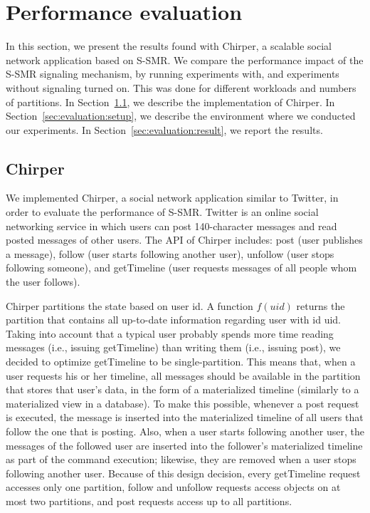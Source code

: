 \documentclass[11pt]{article}
\newcommand{\ssmr}{\mbox{S-SMR}}
\newcommand{\appname}{Chirper} %
\begin{document}
\section{Performance evaluation}
\label{sec:perfeval}

In this section, we present the results found with \appname{}, a scalable social network application based on \ssmr{}.
We compare the performance impact of the \ssmr{} signaling mechanism, by running experiments with, and experiments without signaling turned on.
This was done for different workloads and numbers of partitions.
In Section~\ref{sec:evaluation:app}, we describe the implementation of \appname{}.
In Section~\ref{sec:evaluation:setup}, we describe the environment where we conducted our experiments.
In Section~\ref{sec:evaluation:result}, we report the results.

\subsection{\appname}
\label{sec:evaluation:app}

We implemented \appname{}, a social network application similar to Twitter, in order to evaluate the performance of \ssmr{}.
Twitter is an online social networking service in which users can post 140-character messages and read posted messages of other users.
The API of \appname{} includes: post (user publishes a message), follow (user starts following another user), unfollow (user stops following someone), and getTimeline (user requests messages of all people whom the user follows).

\appname{} partitions the state based on user id. A function $f(uid)$ returns the partition that contains all up-to-date information regarding user with id uid. Taking into account that a typical user probably spends more time reading messages (i.e., issuing getTimeline) than writing them (i.e., issuing post), we decided to optimize getTimeline to be single-partition. This means that, when a user requests his or her timeline, all messages should be available in the partition that stores that user's data, in the form of a materialized timeline (similarly to a materialized view in a database). To make this possible, whenever a post request is executed, the message is inserted into the materialized timeline of all users that follow the one that is posting. Also, when a user starts following another user, the messages of the followed user are inserted into the follower's materialized timeline as part of the command execution; likewise, they are removed when a user stops following another user. Because of this design decision, every getTimeline request accesses only one partition, follow and unfollow requests access objects on at most two partitions, and post requests access up to all partitions.
\end{document}
